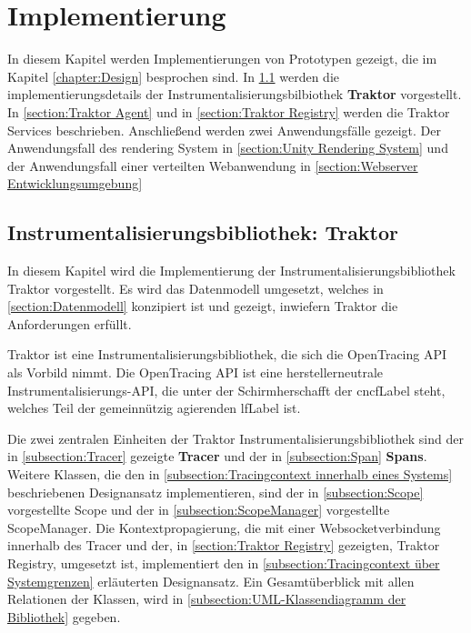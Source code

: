 %
\chapter{Implementierung}
\label{chapter:Implementierung}

In diesem Kapitel werden Implementierungen von Prototypen gezeigt, die im Kapitel \cref{chapter:Design} besprochen sind. In \cref{section:Instrumentalisierungsbibliothek: Traktor} werden die implementierungsdetails der Instrumentalisierungsbilbiothek \textbf{Traktor} vorgestellt. In \cref{section:Traktor Agent} und in \cref{section:Traktor Registry} werden die Traktor Services beschrieben. Anschließend werden zwei Anwendungsfälle gezeigt. Der Anwendungsfall des rendering System in \cref{section:Unity Rendering System} und der Anwendungsfall einer verteilten Webanwendung in \cref{section:Webserver Entwicklungsumgebung}

\section{Instrumentalisierungsbibliothek: Traktor}
\label{section:Instrumentalisierungsbibliothek: Traktor}
In diesem Kapitel wird die Implementierung der Instrumentalisierungsbibliothek Traktor vorgestellt. Es wird das Datenmodell umgesetzt, welches in \cref{section:Datenmodell} konzipiert ist und gezeigt, inwiefern Traktor die Anforderungen erfüllt.

Traktor ist eine Instrumentalisierungsbibliothek, die sich die OpenTracing API als Vorbild nimmt. Die OpenTracing API ist eine herstellerneutrale Instrumentalisierungs-API, die unter der Schirmherschafft der \gls{cncfLabel} steht, welches Teil der gemeinnützig agierenden \gls{lfLabel} ist.

Die zwei zentralen Einheiten der Traktor Instrumentalisierungsbibliothek sind der in \cref{subsection:Tracer} gezeigte \textbf{Tracer} und der in \cref{subsection:Span} \textbf{Spans}. Weitere Klassen, die den in \cref{subsection:Tracingcontext innerhalb eines Systems} beschriebenen Designansatz implementieren, sind der in \cref{subsection:Scope} vorgestellte Scope und der in \cref{subsection:ScopeManager} vorgestellte ScopeManager. Die Kontextpropagierung, die mit einer Websocketverbindung innerhalb des Tracer und der, in \cref{section:Traktor Registry} gezeigten, Traktor Registry, umgesetzt ist, implementiert den in \cref{subsection:Tracingcontext über Systemgrenzen} erläuterten Designansatz. Ein Gesamtüberblick mit allen Relationen der Klassen, wird in \cref{subsection:UML-Klassendiagramm der Bibliothek} gegeben.

